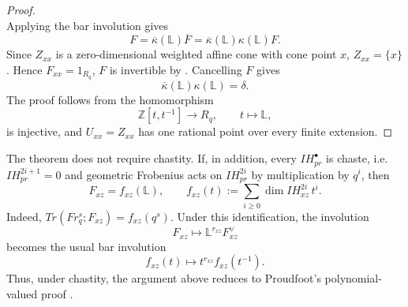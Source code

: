 \documentclass[a4paper]{article}
\newcommand\Gm{{\mathbb{G}_m}}
\newcommand\LL{{\mathbb{L}}}
\begin{document}
\begin{theorem}[thm:]{}
\begin{proof}
\[                \]
                Applying the bar involution gives
                \[
                        F=\overline{\kappa}(\LL)\overline{F}
                        =\overline{\kappa}(\LL)\kappa(\LL)F.
                \]
                Since $Z_{xx}$ is a zero-dimensional weighted affine cone with cone point $x$, $Z_{xx}=\{x\}$. Hence $F_{xx}=1_{R_q}$, $F$ is invertible by . Cancelling $F$ gives
                \[
                        \overline{\kappa}(\LL)\kappa(\LL)=\delta.
                \]
                The proof follows from the homomorphism
                \[
                        \mathbb Z[t,t^{-1}]\longrightarrow R_q,\qquad t\longmapsto\LL,
                \]
                is injective, and $U_{xx}=Z_{xx}$ has one rational point over every finite extension.
        \end{proof}
\end{theorem}

\begin{remark}
        The theorem does not require chastity.
        If, in addition, every $IH_{pr}^\bullet$ is chaste, i.e. $IH_{pr}^{2i+1}=0$ and geometric Frobenius acts on $IH_{pr}^{2i}$ by multiplication by $q^i$, then
        \[
                F_{xz}=f_{xz}(\LL),
                \qquad
                f_{xz}(t):=
                \sum_{i\geq0}\dim IH_{xz}^{2i}\,t^i.
        \]
        Indeed, $Tr(Fr_q^s;F_{xz}) = f_{xz}(q^s)$.  Under this identification, the involution
        \[
                F_{xz}\longmapsto
                \LL^{r_{xz}}F_{xz}^\vee
        \]
        becomes the usual bar involution
        \[
                f_{xz}(t)\longmapsto
                t^{r_{xz}}f_{xz}(t^{-1}).
        \]
        Thus, under chastity, the argument above reduces to Proudfoot's polynomial-valued proof \cite[Section~3.2]{Proudfoot2018}.
\end{remark}







\end{document}
